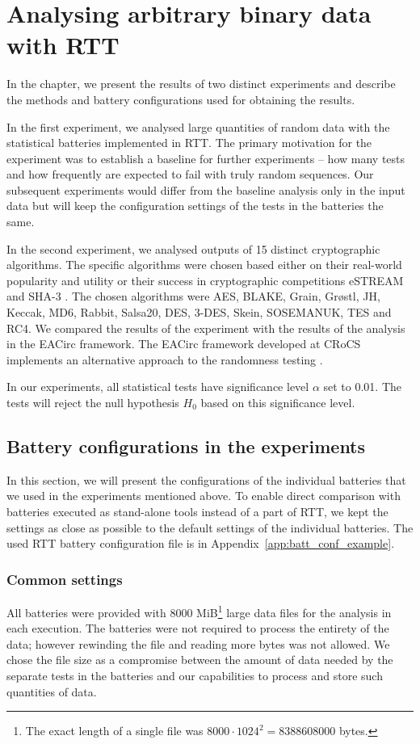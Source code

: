 \documentclass[
  digital,  	%
  color,		%
  oneside,   	%
  12pt,
  nocover,
  notable,
  nolof,
  nolot,
]{fithesis3}
\theoremstyle{definition}
\theoremstyle{remark}
\begin{document}
\chapter{Analysing arbitrary binary data with RTT}
\label{chap:crypto_fn_analysis}

In the chapter, we present the results of two distinct experiments and describe the methods and battery configurations used for obtaining the results.

In the first experiment, we analysed large quantities of random data with the statistical batteries implemented in RTT. The primary motivation for the experiment was to establish a baseline for further experiments -- how many tests and how frequently are expected to fail with truly random sequences. Our subsequent experiments would differ from the baseline analysis only in the input data but will keep the configuration settings of the tests in the batteries the same.

In the second experiment, we analysed outputs of 15 distinct cryptographic algorithms. The specific algorithms were chosen based either on their real-world popularity and utility or their success in cryptographic competitions eSTREAM \cite{estream-competition} and SHA-3 \cite{sha3-competition}. The chosen algorithms were AES, BLAKE, Grain, Gr\o stl, JH, Keccak, MD6, Rabbit, Salsa20, DES, 3-DES, Skein, SOSEMANUK, TES and RC4. We compared the results of the experiment with the results of the analysis in the EACirc framework. The EACirc framework developed at CRoCS implements an alternative approach to the randomness testing \cite{eacirc-github}.

In our experiments, all statistical tests have significance level $\alpha$ set to 0.01. The tests will reject the null hypothesis $H_0$ based on this significance level.

\section{Battery configurations in the experiments}
\label{sec:configuration_of_batteries}
In this section, we will present the configurations of the individual batteries that we used in the experiments mentioned above. To enable direct comparison with batteries executed as stand-alone tools instead of a part of RTT, we kept the settings as close as possible to the default settings of the individual batteries. The used RTT battery configuration file is in Appendix~\ref{app:batt_conf_example}.

\subsection{Common settings}
All batteries were provided with 8000 MiB\footnote{The exact length of a single file was $8000 \cdot 1024^2 = 8388608000$ bytes.} large data files for the analysis in each execution. The batteries were not required to process the entirety of the data; however rewinding the file and reading more bytes was not allowed. We chose the file size as a compromise between the amount of data needed by the separate tests in the batteries and our capabilities to process and store such quantities of data.
\end{document}
